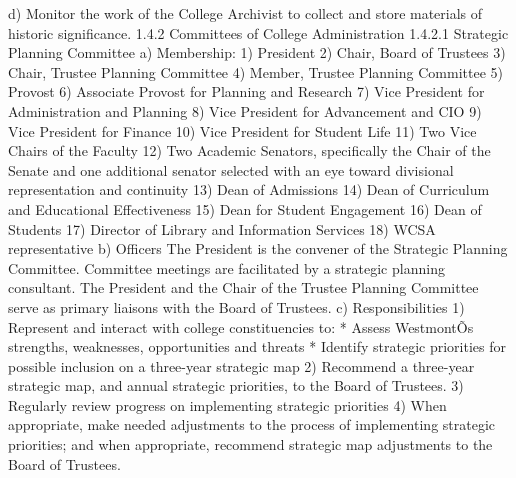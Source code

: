 \documentclass[letterpaper, 11pt]{article}
\begin{document}
d) Monitor the work of the College Archivist to collect and store materials of historic significance.
1.4.2 Committees of College Administration
1.4.2.1 Strategic Planning Committee
a)	Membership:
1) President
2) Chair, Board of Trustees
3) Chair, Trustee Planning Committee
4) Member, Trustee Planning Committee
5) Provost
6) Associate Provost for Planning and Research
7) Vice President for Administration and Planning
8) Vice President for Advancement and CIO
9) Vice President for Finance
10) Vice President for Student Life 
11) Two Vice Chairs of the Faculty
12) Two Academic Senators, specifically the Chair of the Senate and one additional senator selected with an eye toward divisional representation and continuity
13) Dean of Admissions
14) Dean of Curriculum and Educational Effectiveness
15) Dean for Student Engagement
16) Dean of Students
17) Director of Library and Information Services
18) WCSA representative
b)  Officers
The President is the convener of the Strategic Planning Committee.  Committee meetings are facilitated by a strategic planning consultant.  The President and the Chair of the Trustee Planning Committee serve as primary liaisons with the Board of Trustees.
c) Responsibilities
1) Represent and interact with college constituencies to:
* Assess WestmontÕs strengths, weaknesses, opportunities and threats
* Identify strategic priorities for possible inclusion on a three-year strategic map
2) Recommend a three-year strategic map, and annual strategic priorities, to the Board of Trustees.
3) Regularly review progress on implementing strategic priorities
4) When appropriate, make needed adjustments to the process of implementing strategic priorities; and when appropriate, recommend strategic map adjustments to the Board of Trustees.
\end{document}
